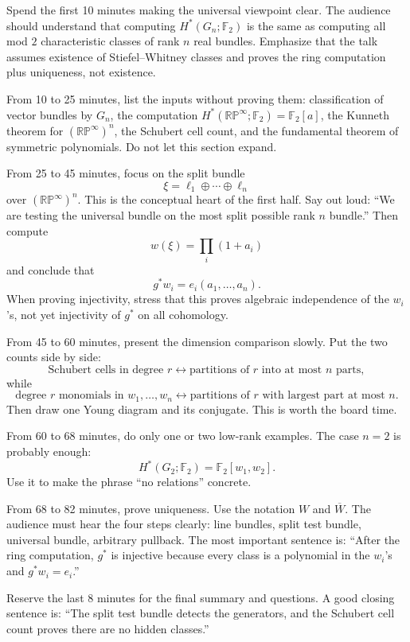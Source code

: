 \documentclass[11pt]{article}
\theoremstyle{remark}
\newcommand{\F}{\mathbb F}
\newcommand{\RP}{\mathbb{RP}}
\newcommand{\Gn}{G_n}
\newcommand{\olW}{\overline{W}}
\begin{document}
Spend the first 10 minutes making the universal viewpoint clear.  The audience should understand that computing $H^*(\Gn;\F_2)$ is the same as computing all mod $2$ characteristic classes of rank $n$ real bundles.  Emphasize that the talk assumes existence of Stiefel--Whitney classes and proves the ring computation plus uniqueness, not existence.

From 10 to 25 minutes, list the inputs without proving them: classification of vector bundles by $\Gn$, the computation $H^*(\RP^\infty;\F_2)=\F_2[a]$, the Kunneth theorem for $(\RP^\infty)^n$, the Schubert cell count, and the fundamental theorem of symmetric polynomials.  Do not let this section expand.

From 25 to 45 minutes, focus on the split bundle
\[
  \xi=\ell_1\oplus\cdots\oplus\ell_n
\]
over $(\RP^\infty)^n$.  This is the conceptual heart of the first half.  Say out loud: ``We are testing the universal bundle on the most split possible rank $n$ bundle.''  Then compute
\[
  w(\xi)=\prod_i(1+a_i)
\]
and conclude that
\[
  g^*w_i=e_i(a_1,
  \dots,a_n).
\]
When proving injectivity, stress that this proves algebraic independence of the $w_i$'s, not yet injectivity of $g^*$ on all cohomology.

From 45 to 60 minutes, present the dimension comparison slowly.  Put the two counts side by side:
\[
  \text{Schubert cells in degree $r$}
  \longleftrightarrow
  \text{partitions of $r$ into at most $n$ parts},
\]
while
\[
  \text{degree $r$ monomials in $w_1,\dots,w_n$}
  \longleftrightarrow
  \text{partitions of $r$ with largest part at most $n$}.
\]
Then draw one Young diagram and its conjugate.  This is worth the board time.

From 60 to 68 minutes, do only one or two low-rank examples.  The case $n=2$ is probably enough:
\[
  H^*(G_2;\F_2)=\F_2[w_1,w_2].
\]
Use it to make the phrase ``no relations'' concrete.

From 68 to 82 minutes, prove uniqueness.  Use the notation $W$ and $\olW$.  The audience must hear the four steps clearly: line bundles, split test bundle, universal bundle, arbitrary pullback.  The most important sentence is: ``After the ring computation, $g^*$ is injective because every class is a polynomial in the $w_i$'s and $g^*w_i=e_i$.''

Reserve the last 8 minutes for the final summary and questions.  A good closing sentence is: ``The split test bundle detects the generators, and the Schubert cell count proves there are no hidden classes.''
\end{document}
